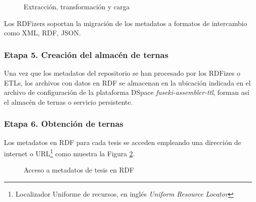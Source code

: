 \begin{figure}[!ht]
	\centering
    \caption{Extracci\'on, transformaci\'on y carga}
    \label{etl-diagrama}
\end{figure}

Los RDFizers soportan la migraci\'on de los metadatos a formatos de intercambio como XML, RDF, JSON. \newline

\subsubsection{Etapa 5. Creaci\'on del almac\'en de ternas}

Una vez que los metadatos del repositorio se han procesado por los RDFizes o ETLs, los archivos con datos en RDF se almacenan en la ubicaci\'on indicada en el archivo de configuraci\'on de la plataforma DSpace \textit{fuseki-assembler-ttl}, forman as\'i el almac\'en de ternas o servicio persistente.

\subsubsection{Etapa 6. Obtenci\'on de ternas}

Los metadatos en RDF para cada tesis se acceden empleando una direcci\'on de internet o URL\footnote{Localizador Uniforme de recursos, en ingl\'es \textit{Uniform Resource Locator}} como muestra la Figura \ref{accesoRdf}.\newline

\begin{figure}[!ht]
	\centering
    \caption{Acceso a metadatos de tesis en RDF}
    \label{accesoRdf}
\end{figure}

